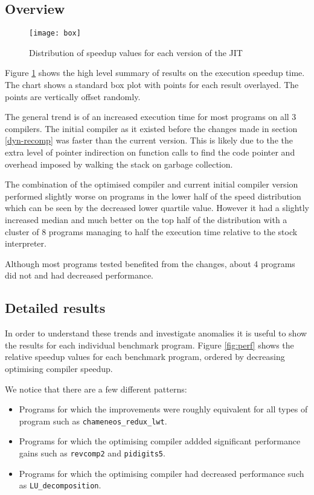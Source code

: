 \subsection{Overview}

\begin{figure}[h]
      \texttt{[image: box]}
      \caption{Distribution of speedup values for each version of the JIT}
      \label{fig:box}
\end{figure}

Figure \ref{fig:box} shows the high level summary of results on the execution speedup time. The
chart shows a standard box plot with points for each result overlayed. The points are vertically
offset randomly.

The general trend is of an increased execution time for most programs on all 3 compilers. The
initial compiler as it existed before the changes made in section \ref{dyn-recomp} was faster than
the current version. This is likely due to the the extra level of pointer indirection on function
calls to find the code pointer and overhead imposed by walking the stack on garbage collection.

The combination of the optimised compiler and current initial compiler version performed slightly
worse on programs in the lower half of the speed distribution  which can be seen by the decreased
lower quartile value.  However it had a slightly increased median and much better on the top half
of the distribution with a cluster of 8 programs managing to half the execution time relative to
the stock interpreter.

Although most programs tested benefited from the changes, about 4 programs did not and had
decreased
performance.

\subsection{Detailed results}

In order to understand these trends and investigate anomalies it is useful to show the results for
each individual benchmark program. Figure \ref{fig:perf} shows the relative speedup values for each
benchmark program, ordered by decreasing optimising compiler speedup.

We notice that there are a few different patterns:

\begin{itemize}
      \item Programs for which the improvements were roughly equivalent for all types of program
            such as \texttt{chameneos\_redux\_lwt}.
      \item Programs for which the optimising compiler addded significant performance gains such as
            \texttt{revcomp2} and \texttt{pidigits5}.
      \item Programs for which the optimising compiler had decreased performance such as
            \texttt{LU\_decomposition}.
\end{itemize}

